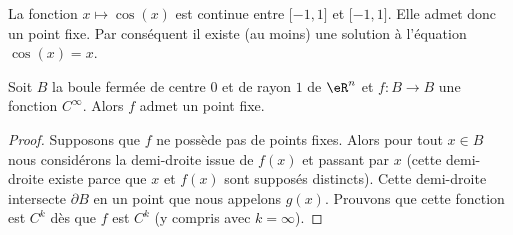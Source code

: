 \begin{example}
    La fonction \( x\mapsto\cos(x)\) est continue entre \( \mathopen[ -1 , 1 \mathclose]\) et \( \mathopen[ -1 , 1 \mathclose]\). Elle admet donc un point fixe. Par conséquent il existe (au moins) une solution à l'équation \( \cos(x)=x\).
\end{example}

\begin{proposition}     \label{PropDRpYwv}
    Soit \( B\) la boule fermée de centre \( 0\) et de rayon \( 1\) de \( \eR^n\) et \( f\colon B\to B\) une fonction \(  C^{\infty}\). Alors \( f\) admet un point fixe.
\end{proposition}

\begin{proof}
    Supposons que \( f\) ne possède pas de points fixes. Alors pour tout \( x\in B\) nous considérons la demi-droite issue de \( f(x)\) et passant par \( x\) (cette demi-droite existe parce que \( x\) et \( f(x)\) sont supposés distincts). Cette demi-droite intersecte \( \partial B\) en un point que nous appelons \( g(x)\). Prouvons que cette fonction est \( C^k\) dès que \( f\) est \( C^k\) (y compris avec \( k=\infty\)).


\end{proof}
